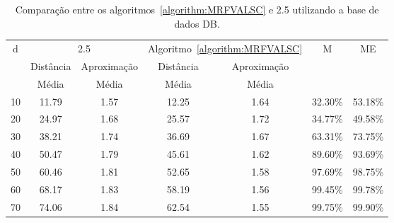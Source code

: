 \begin{table}[!htb]
  \caption{Comparação entre os algoritmos~\ref{algorithm:MRFVALSC} e 2.5\SbIRT{} utilizando a base de dados DB\textsubscript{\SbIRTM}.}
  \label{table:CFCQOBJI}
  \centering
  \begin{tabular}{|c|c|c|c|c|c|c|}
  \hline
           \multirow{3}{*}{d} &                \multicolumn{2}{c|}{2.5\SbIRTM{}}  & \multicolumn{2}{c|}{Algoritmo~\ref{algorithm:MRFVALSC}} &      \multirow{3}{*}{M} &     \multirow{3}{*}{ME} \\ \cline{2-5}
                              &               Distância &             Aproximação &                     Distância &             Aproximação &                         &                         \\
                              &                   Média &                   Média &                         Média &                   Média &                         &                         \\ \hline
  10                          &                   11.79 &                    1.57 &                         12.25 &                    1.64 &                 32.30\% &                 53.18\% \\ \hline
  20                          &                   24.97 &                    1.68 &                         25.57 &                    1.72 &                 34.77\% &                 49.58\% \\ \hline
  30                          &                   38.21 &                    1.74 &                         36.69 &                    1.67 &                 63.31\% &                 73.75\% \\ \hline
  40                          &                   50.47 &                    1.79 &                         45.61 &                    1.62 &                 89.60\% &                 93.69\% \\ \hline
  50                          &                   60.46 &                    1.81 &                         52.65 &                    1.58 &                 97.69\% &                 98.75\% \\ \hline
  60                          &                   68.17 &                    1.83 &                         58.19 &                    1.56 &                 99.45\% &                 99.78\% \\ \hline
  70                          &                   74.06 &                    1.84 &                         62.54 &                    1.55 &                 99.75\% &                 99.90\% \\ \hline

\end{tabular}
\end{table}
